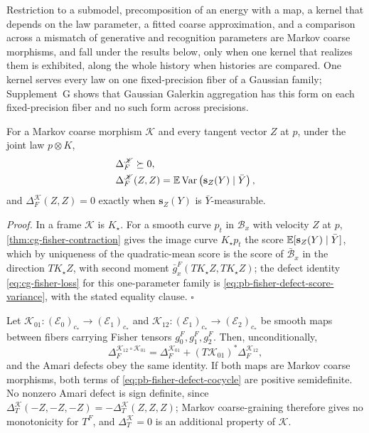 Restriction to a submodel, precomposition of an energy with a map, a kernel that depends
on the law parameter, a fitted coarse approximation, and a comparison across a mismatch
of generative and recognition parameters are Markov coarse morphisms, and fall under the
results below, only when one kernel that realizes them is exhibited, along the whole history when histories are
compared.  One kernel serves every law on one fixed-precision fiber of a Gaussian
family; Supplement~G shows that Gaussian Galerkin aggregation has this form on each
fixed-precision fiber and no such form across precisions.

For a Markov coarse morphism $\mathscr K$ and every tangent vector $Z$ at $p$, under the
joint law $p\otimes K$,
\begin{align}
&\Delta_F^{\mathscr K}\succeq0,
\label{eq:pb-fisher-defect-positive}\\
&\Delta_F^{\mathscr K}(Z,Z)
=\mathbb E\operatorname{Var}\left(\mathbf s_Z(Y)\mid\bar Y\right),
\label{eq:pb-fisher-defect-score-variance}
\end{align}
and $\Delta_F^{\mathscr K}(Z,Z)=0$ exactly when $\mathbf s_Z(Y)$ is $\bar Y$-measurable.

\noindent\emph{Proof.}
In a frame $\mathscr K$ is $K_\star$.  For a smooth curve $p_t$ in $\mathcal B_x$ with
velocity $Z$ at $p$, \cref{thm:cg-fisher-contraction} gives the image curve
$K_\star p_t$ the score $\mathbb E[\mathbf s_Z(Y)\mid\bar Y]$, which by uniqueness of the
quadratic-mean score is the score of $\bar{\mathcal B}_x$ in the direction $TK_\star Z$,
with second moment $\bar g^F_x(TK_\star Z,TK_\star Z)$; the defect identity \eqref{eq:cg-fisher-loss} for this one-parameter family is
\eqref{eq:pb-fisher-defect-score-variance}, with the stated equality clause.  $\square$

Let $\mathscr K_{01}:(\mathcal E_0)_{c_*}\to(\mathcal E_1)_{c_*}$ and
$\mathscr K_{12}:(\mathcal E_1)_{c_*}\to(\mathcal E_2)_{c_*}$ be smooth maps between
fibers carrying Fisher tensors $g^F_0,g^F_1,g^F_2$.  Then, unconditionally,
\begin{equation}
\Delta_F^{\mathscr K_{12}\circ\mathscr K_{01}}
=\Delta_F^{\mathscr K_{01}}
+(T\mathscr K_{01})^*\Delta_F^{\mathscr K_{12}},
\label{eq:pb-fisher-defect-cocycle}
\end{equation}
and the Amari defects obey the same identity.  If both maps are Markov coarse morphisms,
both terms of \eqref{eq:pb-fisher-defect-cocycle} are positive semidefinite.  No nonzero
Amari defect is sign definite, since
$\Delta_T^{\mathscr K}(-Z,-Z,-Z)=-\Delta_T^{\mathscr K}(Z,Z,Z)$; Markov coarse-graining
therefore gives no monotonicity for $T^F$, and $\Delta_T^{\mathscr K}=0$ is an additional
property of $\mathscr K$.  

